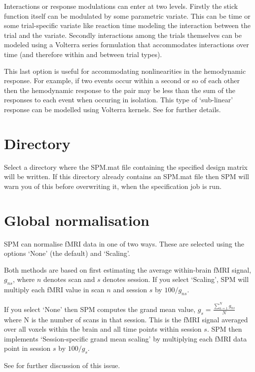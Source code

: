 \documentclass[a4paper,titlepage]{book}
\begin{document}
Interactions or response modulations can enter at two levels.  Firstly the stick function itself can be modulated by some parametric variate. This can be time or some trial-specific variate like reaction time modeling the interaction between the trial and the variate. Secondly interactions among the trials themselves can be modeled using a Volterra series formulation that accommodates interactions over time (and therefore within and between trial types). 

This last option is useful 
for accommodating nonlinearities in the hemodynamic response. For 
example, if two events occur within a 
second or so of each other then the hemodynamic response to 
the pair may be less than the sum of the responses to each event when occuring in isolation. This type of `sub-linear' response can be modelled using
Volterra kernels. See \cite{balloon} for further details.

\section{Directory}
Select a directory where the SPM.mat file containing the specified design matrix will be written. If this directory already contains an SPM.mat file then SPM will warn you of this before overwriting it, when the specification job is run.


\section{Global normalisation}

SPM can normalise fMRI data in one of two ways. These are 
selected using the options `None' (the default) and `Scaling'. 

Both methods are based on first estimating the average within-brain fMRI signal, $g_{ns}$, where $n$ denotes scan and $s$ denotes session.
If you select `Scaling', SPM will multiply each fMRI value in scan $n$ and session $s$ by $100/g_{ns}$.

If you select `None' then SPM computes the grand mean value, $g_s=\frac{\sum_{n=1}^N g_{ns}}{N}$ where N is the number of scans in that 
session.
This is the fMRI signal averaged over all voxels within the brain and all time points within session $s$. SPM then implements `Session-specific grand mean scaling' by multiplying each fMRI data point in session $s$ by $100/g_s$. 
 
See \cite{ja_global} for further discussion of this issue.
\end{document}
